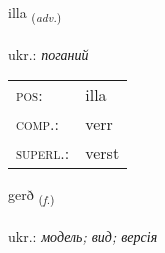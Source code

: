 \documentclass[frontgrid, backgrid]{flacards}\usepackage[]{graphicx}\usepackage[]{xcolor}
\begin{document}
\renewcommand{\blhead}{\vskip5pt {\small\bfseries\footnotesize Atviksorð | прислівник }}
\renewcommand{\bcfoot}{\vskip5pt \hspace{2pt}{\small\bfseries\footnotesize 1K}}


{illa \small{\textsubscript{(\textit{adv.})}} \\[1ex] %
\textphonetic{[ɪtla]} \\
ukr.: \emph{поганий} \\  [2ex]
\renewcommand*{\arraystretch}{0.8}
\begin{tabular}{ll}
\textsc{pos}: & illa \\ 
\textsc{comp.}: & verr \\ 
\textsc{superl.}: & verst \\
\end{tabular}
}

\renewcommand{\flhead}{\vskip5pt \fboxsep=0pt {\small\bfseries\footnotesize Nafnorð | іменник}}
\renewcommand{\fcfoot}{\vskip5pt \fboxsep=0pt \hspace{2pt}{\small\bfseries\footnotesize 1K}}

\renewcommand{\blhead}{\vskip5pt {\small\bfseries\footnotesize Nafnorð | іменник }}
\renewcommand{\bcfoot}{\vskip5pt \hspace{2pt}{\small\bfseries\footnotesize 1K}}


{gerð \small{\textsubscript{(\textit{f.})}} \\[1ex] %
\textphonetic{[cɛrð]} \\
ukr.: \emph{модель; вид; версія} \\  [2ex]
\renewcommand*{\arraystretch}{0.8}
}

\renewcommand{\flhead}{\vskip5pt \fboxsep=0pt {\small\bfseries\footnotesize Lýsingarorð | прикметник}}
\renewcommand{\fcfoot}{\vskip5pt \fboxsep=0pt \hspace{2pt}{\small\bfseries\footnotesize 1K}}
\end{document}
